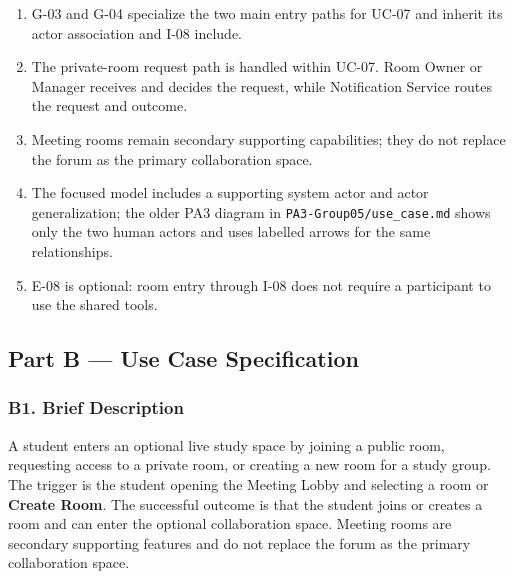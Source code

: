 \documentclass[12pt]{article}
\begin{document}
\begin{enumerate}
\item G-03 and G-04 specialize the two main entry paths for UC-07 and inherit its actor association and I-08 include.
\item The private-room request path is handled within UC-07. Room Owner or Manager receives and decides the request, while Notification Service routes the request and outcome.
\item Meeting rooms remain secondary supporting capabilities; they do not replace the forum as the primary collaboration space.
\item The focused model includes a supporting system actor and actor generalization; the older PA3 diagram in \texttt{PA3-Group05/use\_case.md} shows only the two human actors and uses labelled arrows for the same relationships.
\item E-08 is optional: room entry through I-08 does not require a participant to use the shared tools.
\end{enumerate}
\par\medskip

\hypertarget{sec:part-b-use-case-specification}{}
\subsection*{Part B --- Use Case Specification}
\par\medskip

\hypertarget{sec:b1-brief-description}{}
\subsubsection*{B1. Brief Description}
\par\medskip

A student enters an optional live study space by joining a public room, requesting access to a private room, or creating a new room for a study group. The trigger is the student opening the Meeting Lobby and selecting a room or \textbf{Create Room}. The successful outcome is that the student joins or creates a room and can enter the optional collaboration space. Meeting rooms are secondary supporting features and do not replace the forum as the primary collaboration space.
\par\medskip

\hypertarget{sec:b2-preconditions}{}
\end{document}
